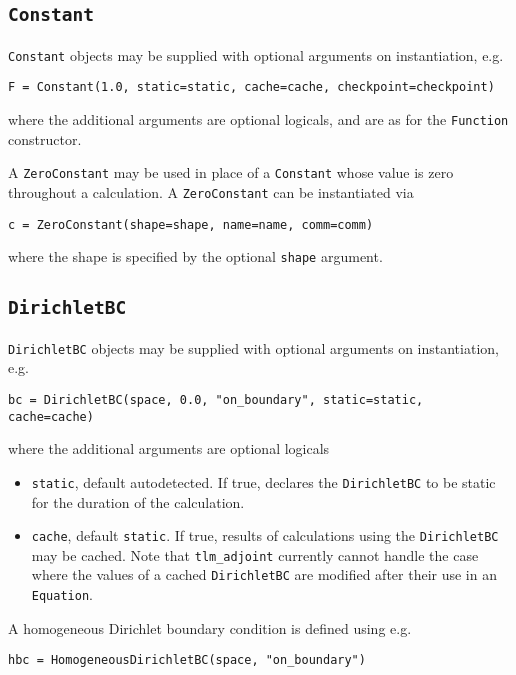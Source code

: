 \documentclass[11pt]{article}
\begin{document}
\subsection{\texttt{Constant}}

\texttt{Constant} objects may be supplied with optional arguments on
instantiation, e.g.
\begin{lstlisting}
F = Constant(1.0, static=static, cache=cache, checkpoint=checkpoint)
\end{lstlisting}
where the additional arguments are optional logicals, and are as for the
\texttt{Function} constructor.

A \texttt{ZeroConstant} may be used in place of a \texttt{Constant} whose value
is zero throughout a calculation. A \texttt{ZeroConstant} can be instantiated
via
\begin{lstlisting}
c = ZeroConstant(shape=shape, name=name, comm=comm)
\end{lstlisting}
where the shape is specified by the optional \texttt{shape} argument.

\subsection{\texttt{DirichletBC}}

\texttt{DirichletBC} objects may be supplied with optional arguments on
instantiation, e.g.
\begin{lstlisting}
bc = DirichletBC(space, 0.0, "on_boundary", static=static, cache=cache)
\end{lstlisting}
where the additional arguments are optional logicals
\begin{itemize}
  \item \texttt{static}, default autodetected. If true, declares the
    \texttt{DirichletBC} to be static for the duration of the calculation.
  \item \texttt{cache}, default \texttt{static}. If true, results of
    calculations using the \texttt{DirichletBC} may be cached. Note that
    \texttt{tlm\_adjoint} currently cannot handle the case where the values of
    a cached \texttt{DirichletBC} are modified after their use in an
    \texttt{Equation}.
\end{itemize}

A homogeneous Dirichlet boundary condition is defined using e.g.
\begin{lstlisting}
hbc = HomogeneousDirichletBC(space, "on_boundary")
\end{lstlisting}
\end{document}
